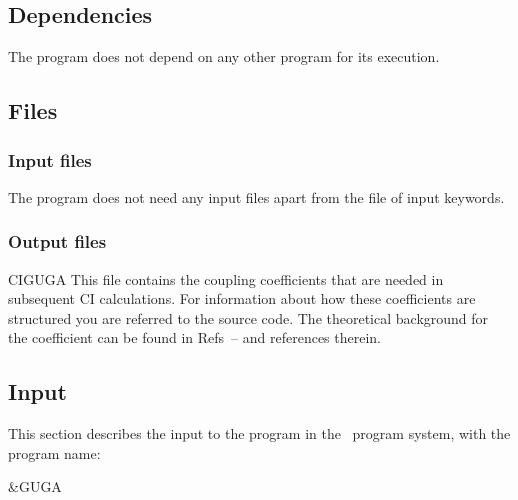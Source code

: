 \subsection{Dependencies}
\label{UG:sec:guga_dependencies}
The  program does not depend on any other program for its
execution.

\subsection{Files}
\label{UG:sec:guga_files}
\subsubsection{Input files}

The  program does not need any input files apart from the file of
input keywords.

\subsubsection{Output files}
\begin{filelist}
\item[CIGUGA]
This file contains the coupling coefficients that are needed in
subsequent CI calculations. For information about how these
coefficients are structured you are referred to the source
code\cite{Siegbahn:80}. The theoretical background for the
coefficient can be found in Refs~{\cite{Shavitt:77}--\cite{Siegbahn:80}} and
references therein.
\end{filelist}

\subsection{Input}
\label{UG:sec:guga_input}
This section describes the input to the
 program in the \molcas\ program system, with the program name:
\begin{inputlisting}
 &GUGA
\end{inputlisting}

